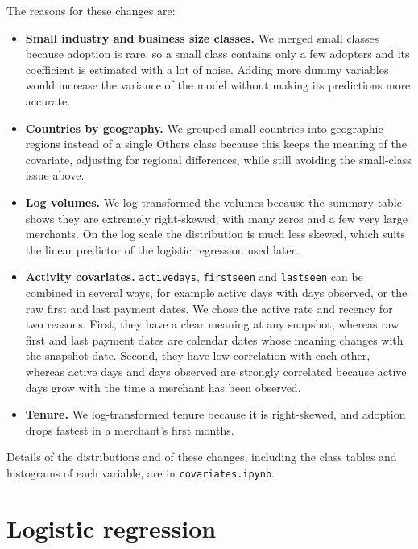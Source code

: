 \documentclass[11pt]{article}
\newcommand{\code}[1]{\begingroup\renewcommand{\_}{\textunderscore\allowbreak}\texttt{#1}\endgroup}  %
\begin{document}
The reasons for these changes are:
\begin{itemize}
  \item \textbf{Small industry and business size classes.} We merged small classes because adoption is rare, so a small class contains only a few adopters and its coefficient is estimated with a lot of noise. Adding more dummy variables would increase the variance of the model without making its predictions more accurate.
  \item \textbf{Countries by geography.} We grouped small countries into geographic regions instead of a single Others class because this keeps the meaning of the covariate, adjusting for regional differences, while still avoiding the small-class issue above.
  \item \textbf{Log volumes.} We log-transformed the volumes because the summary table shows they are extremely right-skewed, with many zeros and a few very large merchants. On the log scale the distribution is much less skewed, which suits the linear predictor of the logistic regression used later.
  \item \textbf{Activity covariates.} \code{active\_days}, \code{first\_seen} and \code{last\_seen} can be combined in several ways, for example active days with days observed, or the raw first and last payment dates. We chose the active rate and recency for two reasons. First, they have a clear meaning at any snapshot, whereas raw first and last payment dates are calendar dates whose meaning changes with the snapshot date. Second, they have low correlation with each other, whereas active days and days observed are strongly correlated because active days grow with the time a merchant has been observed.
  \item \textbf{Tenure.} We log-transformed tenure because it is right-skewed, and adoption drops fastest in a merchant's first months.
\end{itemize}
Details of the distributions and of these changes, including the class tables and histograms of each variable, are in \code{covariates.ipynb}.

\section{Logistic regression}\label{sec:logit}
\end{document}
